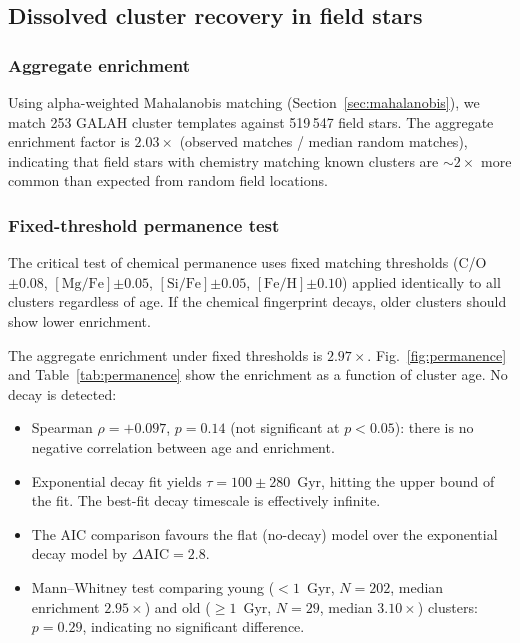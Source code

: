 \documentclass[fleqn,usenatbib]{mnras}
\newcommand{\feh}{$\mathrm{[Fe/H]}$\xspace}
\newcommand{\mgfe}{$\mathrm{[Mg/Fe]}$\xspace}
\newcommand{\sife}{$\mathrm{[Si/Fe]}$\xspace}
\newcommand{\co}{C/O\xspace}
\begin{document}
\subsection{Dissolved cluster recovery in field stars}
\label{sec:recovery}

\subsubsection{Aggregate enrichment}

Using alpha-weighted Mahalanobis matching (Section~\ref{sec:mahalanobis}), we match 253 GALAH cluster templates against 519\,547 field stars.
The aggregate enrichment factor is $2.03\times$ (observed matches / median random matches), indicating that field stars with chemistry matching known clusters are ${\sim}2\times$ more common than expected from random field locations.

\subsubsection{Fixed-threshold permanence test}

The critical test of chemical permanence uses fixed matching thresholds (\co $\pm 0.08$, \mgfe $\pm 0.05$, \sife $\pm 0.05$, \feh $\pm 0.10$) applied identically to all clusters regardless of age.
If the chemical fingerprint decays, older clusters should show lower enrichment.

The aggregate enrichment under fixed thresholds is $2.97\times$.
Fig.~\ref{fig:permanence} and Table~\ref{tab:permanence} show the enrichment as a function of cluster age.
No decay is detected:
\begin{itemize}
\item Spearman $\rho = +0.097$, $p = 0.14$ (not significant at $p < 0.05$): there is no negative correlation between age and enrichment.
\item Exponential decay fit yields $\tau = 100 \pm 280$~Gyr, hitting the upper bound of the fit. The best-fit decay timescale is effectively infinite.
\item The AIC comparison favours the flat (no-decay) model over the exponential decay model by $\Delta\mathrm{AIC} = 2.8$.
\item Mann--Whitney test comparing young ($< 1$~Gyr, $N = 202$, median enrichment $2.95\times$) and old ($\geq 1$~Gyr, $N = 29$, median $3.10\times$) clusters: $p = 0.29$, indicating no significant difference.
\end{itemize}
\end{document}
